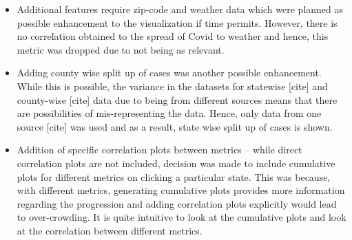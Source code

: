 \begin{itemize}
\item Additional features require zip-code and weather data which were planned as possible enhancement to the visualization if time permits. However, there is no correlation obtained to the spread of Covid to weather and hence, this metric was dropped due to not being as relevant.
\item Adding county wise split up of cases was another possible enhancement. While this is possible, the variance in the datasets for statewise [cite] and county-wise [cite] data due to being from different sources means that there are possibilities of mis-representing the data. Hence, only data from one source [cite] was used and as a result, state wise split up of cases is shown.
\item Addition of specific correlation plots between metrics – while direct correlation plots are not included, decision was made to include cumulative plots for different metrics on clicking a particular state. This was because, with different metrics, generating cumulative plots provides more information regarding the progression and adding correlation plots explicitly would lead to over-crowding. It is quite intuitive to look at the cumulative plots and look at the correlation between different metrics.
\end{itemize}
